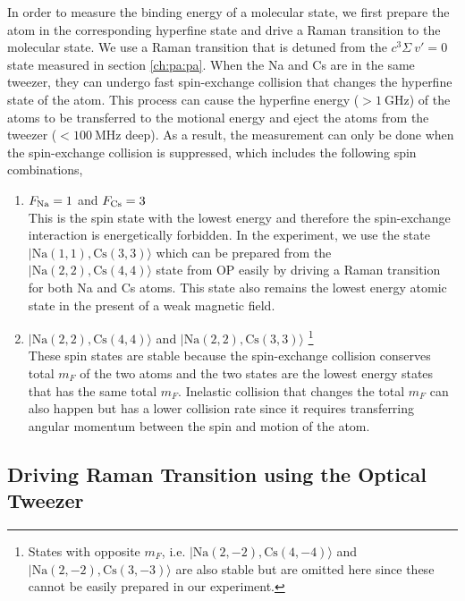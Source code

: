 In order to measure the binding energy of a molecular state,
we first prepare the atom in the corresponding hyperfine state
and drive a Raman transition to the molecular state.
We use a Raman transition that is detuned from the $c^3\Sigma\ v'=0$ state measured
in section \ref{ch:pa:pa}.
When the Na and Cs are in the same tweezer,
they can undergo fast spin-exchange collision that changes the hyperfine state of the atom.
This process can cause the hyperfine energy ($>1~\mathrm{GHz}$) of the atoms
to be transferred to the motional energy
and eject the atoms from the tweezer ($<100~\mathrm{MHz}$ deep).
As a result, the measurement can only be done when the spin-exchange collision is suppressed,
which includes the following spin combinations,
\begin{enumerate}
\item $F_{\mathrm{Na}}=1$ and $F_{\mathrm{Cs}}=3$\\
  This is the spin state with the lowest energy and therefore the spin-exchange interaction
  is energetically forbidden.
  In the experiment, we use the state $|\mathrm{Na(1, 1),Cs(3, 3)}\rangle$
  which can be prepared from the $|\mathrm{Na(2, 2),Cs(4, 4)}\rangle$ state from OP
  easily by driving a Raman transition for both Na and Cs atoms.
  This state also remains the lowest energy atomic state in the present of a weak magnetic field.
\item $|\mathrm{Na(2, 2),Cs(4, 4)}\rangle$ and $|\mathrm{Na(2, 2),Cs(3, 3)}\rangle$
  \footnote{States with opposite $m_F$, i.e.
    $|\mathrm{Na(2, -2),Cs(4, -4)}\rangle$ and $|\mathrm{Na(2, -2),Cs(3, -3)}\rangle$ are also stable
    but are omitted here since these cannot be easily prepared in our experiment.}\\
  These spin states are stable because the spin-exchange collision conserves total $m_F$
  of the two atoms and
  the two states are the lowest energy states that has the same total $m_F$.
  Inelastic collision that changes the total $m_F$ can also happen
  but has a lower collision rate since it requires transferring angular momentum
  between the spin and motion of the atom.
\end{enumerate}

\subsection{Driving Raman Transition using the Optical Tweezer}
\label{ch:raman-spectroscopy:states:raman-tweezer}

